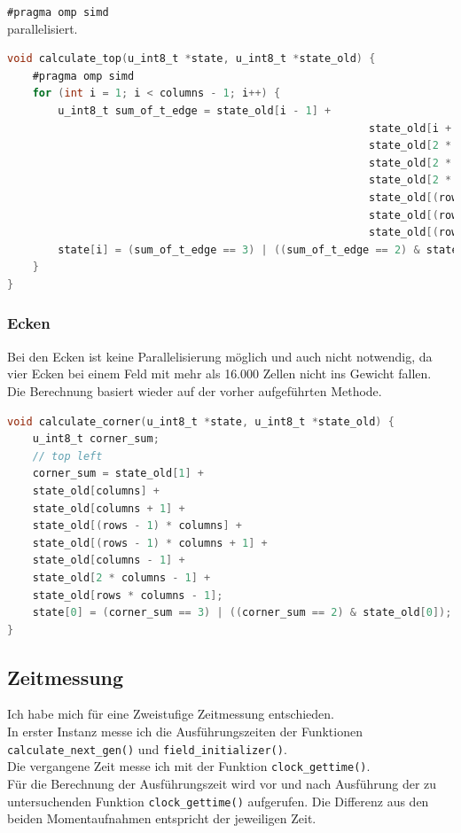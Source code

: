 \documentclass[german,plainarticle,hyperref,utf8]{zihpub}
\begin{document}
	\texttt{\#pragma omp simd}\\
	
	parallelisiert.	
	\begin{lstlisting}[language=C, caption=Berechnung der obersten Zeile]
void calculate_top(u_int8_t *state, u_int8_t *state_old) {
	#pragma omp simd
	for (int i = 1; i < columns - 1; i++) {
		u_int8_t sum_of_t_edge = state_old[i - 1] +
														 state_old[i + 1] +
														 state_old[2 * columns + (i - 1)] +
														 state_old[2 * columns + i] +
														 state_old[2 * columns + (i + 1)] +
														 state_old[(rows - 1) * columns + i] +
														 state_old[(rows - 1) * columns + i + 1] +
														 state_old[(rows - 1) * columns + i - 1];
		state[i] = (sum_of_t_edge == 3) | ((sum_of_t_edge == 2) & state_old[i]);
	}
}\end{lstlisting}

	\subsubsection{Ecken}
	Bei den Ecken ist keine Parallelisierung möglich und auch nicht notwendig, da vier Ecken bei einem Feld mit mehr als 16.000 Zellen nicht ins Gewicht fallen.\\
	Die Berechnung basiert wieder auf der vorher aufgeführten Methode.\\
	
	\begin{lstlisting}[language=C, caption=Berechnung der Ecke oben links]
void calculate_corner(u_int8_t *state, u_int8_t *state_old) {
	u_int8_t corner_sum;
	// top left
	corner_sum = state_old[1] +
	state_old[columns] +
	state_old[columns + 1] +
	state_old[(rows - 1) * columns] +
	state_old[(rows - 1) * columns + 1] +
	state_old[columns - 1] +
	state_old[2 * columns - 1] +
	state_old[rows * columns - 1];
	state[0] = (corner_sum == 3) | ((corner_sum == 2) & state_old[0]);
}\end{lstlisting}
	
	\subsection{Zeitmessung}
	Ich habe mich für eine Zweistufige Zeitmessung entschieden.\\
	
	In erster Instanz messe ich die Ausführungszeiten der Funktionen \texttt{calculate\_next\_gen()} und \texttt{field\_initializer()}.\\
	Die vergangene Zeit messe ich mit der Funktion \texttt{clock\_gettime()}.\\
	Für die Berechnung der Ausführungszeit wird vor und nach Ausführung der zu untersuchenden Funktion \texttt{clock\_gettime()} aufgerufen. Die Differenz aus den beiden Momentaufnahmen entspricht der jeweiligen Zeit.\\
	
\end{document}
